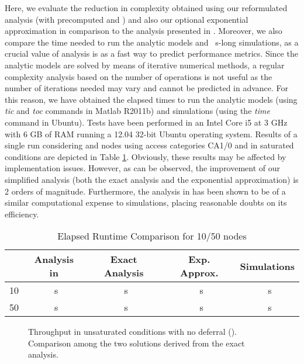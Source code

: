 \documentclass[preprint,12pt]{elsarticle}
\begin{document}
Here, we evaluate the reduction in complexity obtained using our reformulated analysis (with precomputed  and ) and also our optional exponential approximation in comparison to the analysis presented in \cite{chung2006performance}. Moreover, we also compare the time needed to run the analytic models and ~s-long simulations, as a crucial value of analysis is as a fast way to predict performance metrics. Since the analytic models are solved by means of iterative numerical methods, a regular complexity analysis based on the number of operations is not useful as the number of iterations needed may vary and cannot be predicted in advance. For this reason, we have obtained the elapsed times to run the analytic models (using \emph{tic} and \emph{toc} commands in Matlab R2011b) and simulations (using the \emph{time} command in Ubuntu). Tests have been performed in an Intel Core i5 at 3 GHz with 6 GB of RAM running a 12.04 32-bit Ubuntu operating system. Results of a single run considering  and  nodes using access categories CA1/0 and in saturated conditions are depicted in Table \ref{tbl:cpu_runtimes}. Obviously, these results may be affected by implementation issues. However, as can be observed, the improvement of our simplified analysis (both the exact analysis and the exponential approximation) is 2 orders of magnitude. Furthermore, the analysis in \cite{chung2006performance} has been shown to be of a similar computational expense to simulations, placing reasonable doubts on its efficiency. 


\begin{table}
\centering
\begin{tabular}{ccccc} 
 & Analysis in \cite{chung2006performance} & Exact Analysis & Exp. Approx. & Simulations\\ \hline
10 & ~s & ~s & ~s & ~s \\ \hline
50 & ~s & ~s & ~s & ~s \\ \hline
\end{tabular}
\caption{Elapsed Runtime Comparison for 10/50 nodes}\label{tbl:cpu_runtimes}
\end{table}

\begin{figure*}[!tb]
\centering
{}
\caption{Throughput in unsaturated conditions with no deferral (). Comparison among the two solutions derived from the exact analysis.}
\label{fig:unsat_no_deferral}
\end{figure*}
\end{document}
